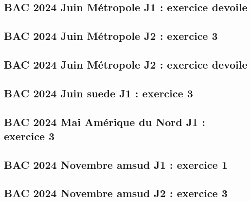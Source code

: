 \documentclass[lang=fr,edition=teacher,layout=sheet]{mxbook}
\begin{document}
\begingroup\endgroup
\par\bigskip
{}\subsection*{BAC 2024 Juin Métropole J1 : exercice devoile}
\begingroup\endgroup
\par\bigskip
{}\subsection*{BAC 2024 Juin Métropole J2 : exercice 3}
\begingroup\endgroup
\par\bigskip
{}\subsection*{BAC 2024 Juin Métropole J2 : exercice devoile}
\begingroup\endgroup
\par\bigskip
{}\subsection*{BAC 2024 Juin suede J1 : exercice 3}
\begingroup\endgroup
\par\bigskip
{}\subsection*{BAC 2024 Mai Amérique du Nord J1 : exercice 3}
\begingroup\endgroup
\par\bigskip
{}\subsection*{BAC 2024 Novembre amsud J1 : exercice 1}
\begingroup\endgroup
\par\bigskip
{}\subsection*{BAC 2024 Novembre amsud J2 : exercice 3}
\end{document}
